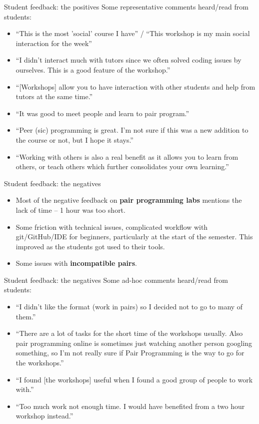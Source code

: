 \documentclass[aspectratio=169, 12pt]{beamer}
\begin{document}
\begin{frame}{Student feedback: the positives}
    Some representative comments heard/read from students:
    \begin{itemize}
        \item ``This is the most 'social' course I have'' / ``This workshop is my main social interaction for the week''
        \item ``I didn't interact much with tutors since we often solved coding issues by ourselves. This is a good feature of the workshop.''
        \item ``[Workshops] allow you to have interaction with other students and help from tutors at the same time.''
        \item ``It was good to meet people and learn to pair program.''
        \item ``Peer (sic) programming is great. I'm not sure if this was a new addition to the course or not, but I hope it stays.''
        \item ``Working with others is also a real benefit as it allows you to learn from others, or teach others which further consolidates your own learning.''
    \end{itemize}
\end{frame}

\begin{frame}{Student feedback: the negatives}
    \begin{itemize}
        \item<1-> Most of the negative feedback on \textbf{pair programming labs} mentions the lack of time -- 1 hour was too short.
        \item<2-> Some friction with technical issues, complicated workflow with git/GitHub/IDE for beginners, particularly at the start of the semester. This improved as the students got used to their tools.
        \item<3-> Some issues with \textbf{incompatible pairs}.
    \end{itemize}
\end{frame}

\begin{frame}{Student feedback: the negatives}
    Some ad-hoc comments heard/read from students:
    \begin{itemize}
        \item ``I didn't like the format (work in pairs) so I decided not to go to many of them.''
        \item ``There are a lot of tasks for the short time of the workshops usually. Also pair programming online is sometimes just watching another person googling something, so I'm not really sure if Pair Programming is the way to go for the workshops.''
        \item ``I found [the workshops] useful when I found a good group of people to work with.''
        \item ``Too much work not enough time. I would have benefited from a two hour workshop instead.''
    \end{itemize}
\end{frame}
\end{document}
